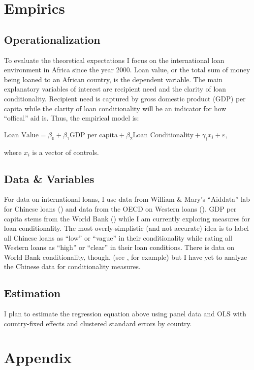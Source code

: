 \documentclass{article}
\begin{document}
\section*{Empirics}
\subsection*{Operationalization}
To evaluate the theoretical expectations I focus on the international loan environment in Africa since the year 2000. Loan value, or the total sum of money being loaned to an African country, is the dependent variable. The main explanatory variables of interest are recipient need and the clarity of loan conditionality. Recipient need is captured by gross domestic product (GDP) per capita while the clarity of loan conditionality will be an indicator for how ``offical'' aid is. Thus, the empirical model is:

$\text{Loan Value}= \beta_0 + \beta_1 \text{GDP per capita}+ \beta_2 \text{Loan Conditionality}+ \gamma_i x_i + \varepsilon$,

where $x_i$ is a vector of controls.

\subsection*{Data \& Variables}
For data on international loans, I use data from William \& Mary's ``Aiddata'' lab for Chinese loans (\cite{custer2021}) and data from the OECD on Western loans (\cite{oecd2022}). GDP per capita stems from the World Bank (\cite{bank2022}) while I am currently exploring measures for loan conditionality. The most overly-simplistic (and not accurate) idea is to label all Chinese loans as ``low'' or ``vague'' in their conditionality while rating all Western loans as ``high'' or ``clear'' in their loan conditions. There is data on World Bank conditionality, though, (see \cite{hernandez2017}, for example) but I have yet to analyze the Chinese data for conditionality measures.

\subsection*{Estimation}
I plan to estimate the regression equation above using panel data and OLS with country-fixed effects and clustered standard errors by country.

\pagebreak
\section*{Appendix}
\end{document}
